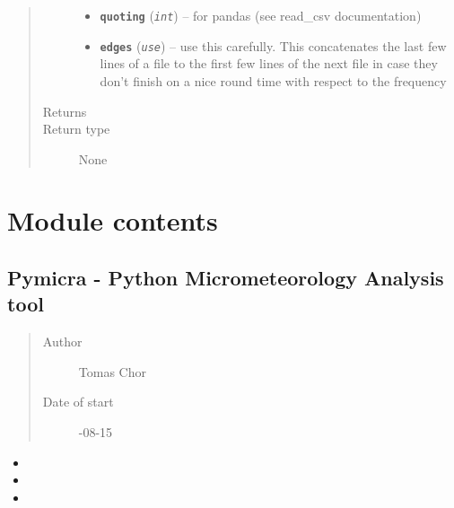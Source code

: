 \documentclass[a4paper,10pt,oneside]{sphinxmanual}
\begin{document}
\begin{fulllineitems}
\begin{quote}
\begin{description}
\begin{itemize}
\item {} 
\textbf{\texttt{quoting}} (\emph{\texttt{int}}) -- for pandas (see read\_csv documentation)

\item {} 
\textbf{\texttt{edges}} (\emph{\texttt{use}}) -- use this carefully. This concatenates the last few lines of a file to the first few lines
of the next file in case they don't finish on a nice round time with respect to the frequency

\end{itemize}

\item[{Returns}] \leavevmode


\item[{Return type}] \leavevmode
None

\end{description}\end{quote}

\end{fulllineitems}



\section{Module contents}
\label{pymicra:module-pymicra}\label{pymicra:module-contents}

\subsection{Pymicra - Python Micrometeorology Analysis tool}
\label{pymicra:pymicra-python-micrometeorology-analysis-tool}\begin{quote}\begin{description}
\item[{Author}] \leavevmode
Tomas Chor

\item[{Date of start}] -08-15

\end{description}\end{quote}
\begin{itemize}
\item {} 

\item {} 

\item {} 

\end{itemize}
\end{document}
